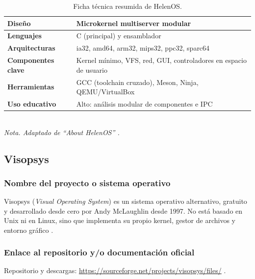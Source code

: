 \begin{table}[H]
    \centering
    \caption{Ficha técnica resumida de HelenOS.}
    \vspace{2mm}
    \begin{tabular}{p{4cm}p{10cm}}
        \hline
        \textbf{Diseño}            & Microkernel multiserver modular                                     \\ \hline
        \textbf{Lenguajes}         & C (principal) y ensamblador                                         \\
        \textbf{Arquitecturas}     & ia32, amd64, arm32, mips32, ppc32, sparc64                          \\
        \textbf{Componentes clave} & Kernel mínimo, VFS, red, GUI, controladores en espacio de usuario   \\
        \textbf{Herramientas}      & GCC (toolchain cruzado), Meson, Ninja, QEMU/VirtualBox              \\
        \textbf{Uso educativo}     & Alto: análisis modular de componentes e IPC                         \\
        \hline
    \end{tabular}
    \vspace{1mm}\\
    \textit{Nota. Adaptado de ``About HelenOS'' \cite{helenos_about}.}
\end{table}

\subsection{Visopsys}

\subsubsection{Nombre del proyecto o sistema operativo}
Visopsys (\textit{Visual Operating System}) es un sistema operativo alternativo, gratuito y desarrollado desde cero por Andy McLaughlin desde 1997. No está basado en Unix ni en Linux, sino que implementa su propio kernel, gestor de archivos y entorno gráfico \cite{visopsys_about}.

\subsubsection{Enlace al repositorio y/o documentación oficial}
Repositorio y descargas: \url{https://sourceforge.net/projects/visopsys/files/} \cite{visopsys_sourceforge}.

